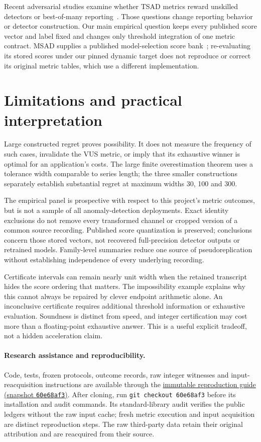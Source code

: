 \documentclass[10pt]{article}
\begin{document}
Recent adversarial studies examine whether TSAD metrics reward unskilled
detectors or best-of-many reporting~\citep{lyu2026}. Those questions
change reporting behavior or detector construction. Our main empirical
question keeps every published score vector and label fixed and changes
only threshold integration of one metric contract. MSAD supplies a
published model-selection score bank~\citep{msad2023}; re-evaluating its
stored scores under our pinned dynamic target does not reproduce or
correct its original metric tables, which use a different implementation.

\section{Limitations and practical interpretation}
Large constructed regret proves possibility. It does not measure the
frequency of such cases, invalidate the VUS metric, or imply that its
exhaustive winner is optimal for an application's costs. The large finite
overestimation theorem uses a tolerance width comparable to series length;
the three smaller constructions separately establish substantial regret
at maximum widths 30, 100 and 300.

The empirical panel is prospective with respect to this project's metric
outcomes, but is not a sample of all anomaly-detection deployments. Exact
identity exclusions do not remove every transformed channel or cropped
version of a common source recording. Published score quantization is
preserved; conclusions concern those stored vectors, not recovered
full-precision detector outputs or retrained models. Family-level
summaries reduce one source of pseudoreplication without establishing
independence of every underlying recording.

Certificate intervals can remain nearly unit width when the retained
transcript hides the score ordering that matters. The impossibility
example explains why this cannot always be repaired by clever endpoint
arithmetic alone. An inconclusive certificate requires additional
threshold information or exhaustive evaluation. Soundness is distinct
from speed, and integer certification may cost more than a floating-point
exhaustive answer. This is a useful explicit tradeoff, not a hidden
acceleration claim.

\paragraph{Research assistance and reproducibility.}
Code, tests, frozen protocols, outcome records, raw integer witnesses and
input-reacquisition instructions are available through the
\href{https://github.com/mandu5/sparse-vus/blob/55f2304ca5a8abdb8e3a4da7c5d8a1f596d72ebc/docs/certified_sampling_reproduction_20261023.md}{immutable reproduction guide (snapshot \texttt{60e68af3})}.
After cloning, run \texttt{git checkout 60e68af3} before its installation
and audit commands.
Its standard-library audit verifies the public ledgers without the raw
input cache; fresh metric execution and input acquisition are distinct
reproduction steps. The raw third-party data retain their original
attribution and are reacquired from their source.
\end{document}
